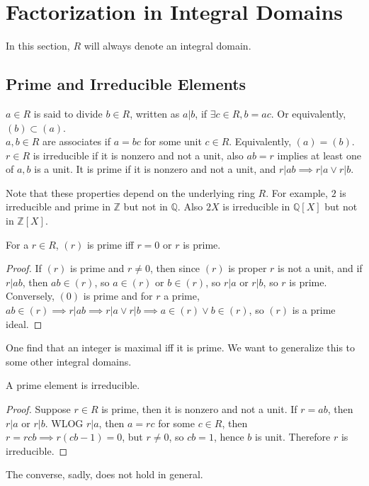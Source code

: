 \section{Factorization in Integral Domains}
In this section, $R$ will always denote an integral domain.
\subsection{Prime and Irreducible Elements}
\begin{definition}
    $a\in R$ is said to divide $b\in R$, written as $a|b$, if $\exists c\in R,b=ac$.
    Or equivalently, $(b)\subset (a)$.\\
    $a,b\in R$ are associates if $a=bc$ for some unit $c\in R$.
    Equivalently, $(a)=(b)$.\\
    $r\in R$ is irreducible if it is nonzero and not a unit, also $ab=r$ implies at least one of $a,b$ is a unit.
    It is prime if it is nonzero and not a unit, and $r|ab\implies r|a\lor r|b$.
\end{definition}
Note that these properties depend on the underlying ring $R$.
For example, $2$ is irreducible and prime in $\mathbb Z$ but not in $\mathbb Q$.
Also $2X$ is irreducible in $\mathbb Q[X]$ but not in $\mathbb Z[X]$.
\begin{lemma}
    For a $r\in R$, $(r)$ is prime iff $r=0$ or $r$ is prime.
\end{lemma}
\begin{proof}
    If $(r)$ is prime and $r\neq 0$, then since $(r)$ is proper $r$ is not a unit, and if $r|ab$, then $ab\in (r)$, so $a\in (r)$ or $b\in (r)$, so $r|a$ or $r|b$, so $r$ is prime.\\
    Conversely, $(0)$ is prime and for $r$ a prime, $ab\in (r)\implies r|ab\implies r|a\lor r|b\implies a\in (r)\lor b\in (r)$, so $(r)$ is a prime ideal.
\end{proof}
One find that an integer is maximal iff it is prime.
We want to generalize this to some other integral domains.
\begin{lemma}
    A prime element is irreducible.
\end{lemma}
\begin{proof}
    Suppose $r\in R$ is prime, then it is nonzero and not a unit.
    If $r=ab$, then $r|a$ or $r|b$.
    WLOG $r|a$, then $a=rc$ for some $c\in R$, then $r=rcb\implies r(cb-1)=0$, but $r\neq 0$, so $cb=1$, hence $b$ is unit.
    Therefore $r$ is irreducible.
\end{proof}
The converse, sadly, does not hold in general.
